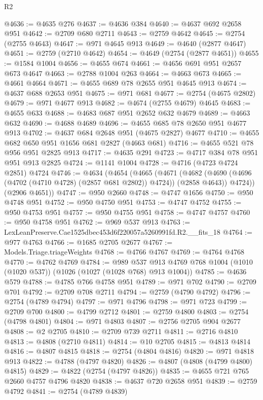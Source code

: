 \begin{lexlean}{R2}
\begin{coremodule}
@4636 := @4635 @276
@4637 := @4636 @384
@4640 := @4637 @692 @2658 @951
@4642 := @2709 @680 @2711
@4643 := @2759 @4642
@4645 := @2754 (@2755 @4643)
@4647 := @971 @4645 @913
@4649 := @4640 (@2877 @4647)
@4651 := @2759 (@2710 @4642)
@4654 := @4649 (@2754 (@2877 @4651))
@4655 := @1584 @1004
@4656 := @4655 @674
@4661 := @4656 @691 @951 @2657 @673 @4647
@4663 := @2788 @1004 @263
@4664 := @4663 @673
@4665 := @4661 @4664
@4671 := @4655 @689 @78 @2655 @951 @4645 @913
@4674 := @4637 @688 @2653 @951
@4675 := @971 @681
@4677 := @2754 (@4675 @2802)
@4679 := @971 @4677 @913
@4682 := @4674 (@2755 @4679) @4645
@4683 := @4655 @633
@4688 := @4683 @687 @951 @2652 @632 @4679
@4689 := @4663 @632
@4690 := @4688 @4689
@4696 := @4655 @685 @78 @2650 @951 @4677 @913
@4702 := @4637 @684 @2648 @951 (@4675 @2827) @4677
@4710 := @4655 @682 @650 @951 @1656 @681 @2827 (@4663 @681)
@4716 := @4655 @521 @78 @956 @951 @2825 @913
@4717 := @4635 @291
@4723 := @4717 @384 @78 @951 @951 @913 @2825
@4724 := @1141 @1004
@4728 := @4716 (@4723 @4724 @2851) @4724
@4746 := @4634
    (@4654
      (@4665
        (@4671
          (@4682 (@4690 (@4696 (@4702 (@4710 @4728) (@2857 @681 @2802)) @4724)) (@2858 @4643))
          @4724))
      (@2906 @4651))
@4747 := @950 @2660
@4748 := @4747 @1656
@4750 := @950 @4748 @951
@4752 := @950 @4750 @951
@4753 := @4747 @4752
@4755 := @950 @4753 @951
@4757 := @950 @4755 @951
@4758 := @4747 @4757
@4760 := @950 @4758 @951
@4762 := @969 @537 @913
@4763 := LexLeanPreserve.Cae1525dbec453d6f220057a5260991fd.R2.__fits_18
@4764 := @977 @4763
@4766 := @1685 @2705 @2677
@4767 := Models.Triage.triageWeights
@4768 := @4766 @4767
@4769 := @4764 @4768
@4770 := @4762 @4769
@4784 := @989
    @537
    @913
    @4769
    @768
    @1004
    (@1010 (@1020 @537))
    (@1026 (@1027 (@1028 @768) @913 @1004))
@4785 := @4636 @579
@4788 := @4785 @766 @4758 @951
@4789 := @971 @702
@4790 := @2709 @701
@4792 := @2709 @708 @2711
@4794 := @2759 (@4790 @4792)
@4796 := @2754 (@4789 @4794)
@4797 := @971 @4796
@4798 := @971 @723
@4799 := @2709 @700
@4800 := @4799 @2712
@4801 := @2759 @4800
@4803 := @2754 (@4798 @4801)
@4804 := @971 @4803
@4807 := @2756 @2705 @904 @2677
@4808 := @2 @2705
@4810 := @2709 @739 @2711
@4811 := @2716 @4810
@4813 := @4808 (@2710 @4811)
@4814 := @10 @2705
@4815 := @4813 @4814
@4816 := @4807 @4815
@4818 := @2754 (@4804 @4816)
@4820 := @971 @4818 @913
@4822 := @4788 (@4797 @4820)
@4826 := @4807 (@4808 (@4799 @4800) @4815)
@4829 := @4822 (@2754 (@4797 @4826))
@4835 := @4655 @721 @765 @2660 @4757 @4796 @4820
@4838 := @4637 @720 @2658 @951
@4839 := @2759 @4792
@4841 := @2754 (@4789 @4839)

\end{coremodule}
\end{lexlean}
